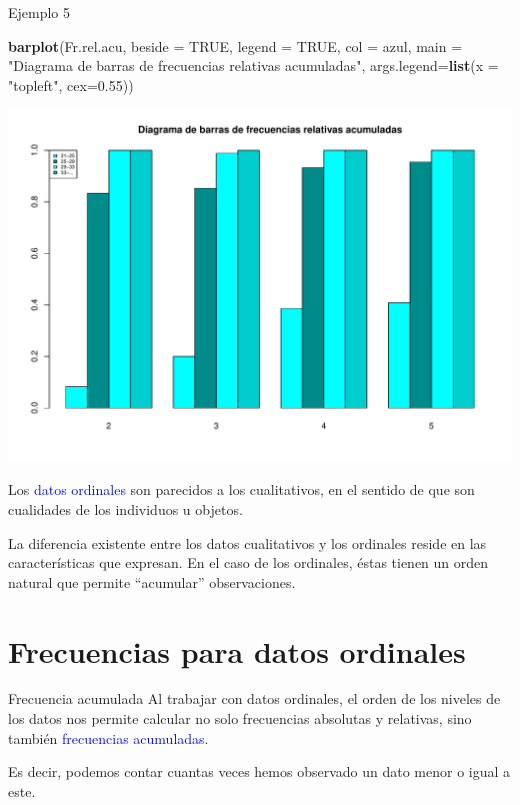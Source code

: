 \documentclass[
  ignorenonframetext,
]{beamer}
\newenvironment{Shaded}{\begin{snugshade}}{\end{snugshade}}
\newcommand{\AttributeTok}[1]{\textcolor[rgb]{0.13,0.29,0.53}{#1}}
\newcommand{\ConstantTok}[1]{\textcolor[rgb]{0.56,0.35,0.01}{#1}}
\newcommand{\FloatTok}[1]{\textcolor[rgb]{0.00,0.00,0.81}{#1}}
\newcommand{\FunctionTok}[1]{\textcolor[rgb]{0.13,0.29,0.53}{\textbf{#1}}}
\newcommand{\NormalTok}[1]{#1}
\newcommand{\StringTok}[1]{\textcolor[rgb]{0.31,0.60,0.02}{#1}}
\newcommand\blue[1]{\textcolor{blue}{#1}}
\begin{document}
\begin{frame}[fragile]{Ejemplo 5}
\label{ejemplo-5-8}
\begin{Shaded}
\begin{Highlighting}[]
\FunctionTok{barplot}\NormalTok{(Fr.rel.acu, }\AttributeTok{beside =} \ConstantTok{TRUE}\NormalTok{, }\AttributeTok{legend =} \ConstantTok{TRUE}\NormalTok{, }\AttributeTok{col =}\NormalTok{ azul, }
        \AttributeTok{main =} \StringTok{"Diagrama de barras de frecuencias relativas acumuladas"}\NormalTok{, }
        \AttributeTok{args.legend=}\FunctionTok{list}\NormalTok{(}\AttributeTok{x =} \StringTok{"topleft"}\NormalTok{, }\AttributeTok{cex=}\FloatTok{0.55}\NormalTok{))}
\end{Highlighting}
\end{Shaded}

\includegraphics[width=0.8\linewidth]{R_base_files/figure-beamer/unnamed-chunk-134-1}

Los \blue{datos ordinales} son parecidos a los cualitativos, en el
sentido de que son cualidades de los individuos u objetos.

La diferencia existente entre los datos cualitativos y los ordinales
reside en las características que expresan. En el caso de los ordinales,
éstas tienen un orden natural que permite ``acumular'' observaciones.
\end{frame}

\section{Frecuencias para datos
ordinales}\label{frecuencias-para-datos-ordinales-1}

\begin{frame}{Frecuencia acumulada}
\label{frecuencia-acumulada-1}
Al trabajar con datos ordinales, el orden de los niveles de los datos
nos permite calcular no solo frecuencias absolutas y relativas, sino
también \blue{frecuencias acumuladas}.

Es decir, podemos contar cuantas veces hemos observado un dato menor o
igual a este.
\end{frame}
\end{document}
